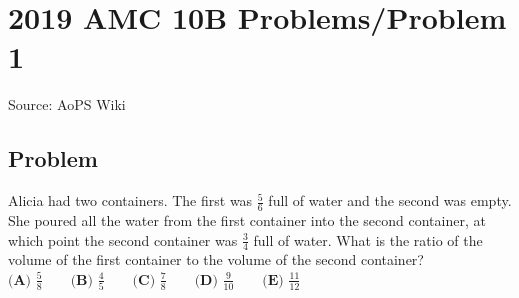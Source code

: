 \documentclass[12pt]{article}
\begin{document}
\section*{{2019 AMC 10B Problems/Problem 1}}
Source: AoPS Wiki

\subsection*{Problem}
Alicia had two containers. The first was $\tfrac{5}{6}$ full of water and the second was empty. She poured all the water from the first container into the second container, at which point the second container was $\tfrac{3}{4}$ full of water. What is the ratio of the volume of the first container to the volume of the second container? $\textbf{(A) } \frac{5}{8} \qquad \textbf{(B) } \frac{4}{5} \qquad \textbf{(C) } \frac{7}{8} \qquad \textbf{(D) } \frac{9}{10} \qquad \textbf{(E) } \frac{11}{12}$
\end{document}
